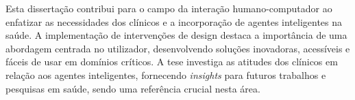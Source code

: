 Esta disserta\c{c}\~{a}o contribui para o campo da intera\c{c}\~{a}o humano-computador ao enfatizar as necessidades dos cl\'{i}nicos e a incorpora\c{c}\~{a}o de agentes inteligentes na sa\'{u}de.
A implementa\c{c}\~{a}o de interven\c{c}\~{o}es de design destaca a import\^{a}ncia de uma abordagem centrada no utilizador, desenvolvendo solu\c{c}\~{o}es inovadoras, acess\'{i}veis e f\'{a}ceis de usar em dom\'{i}nios cr\'{i}ticos.
A tese investiga as atitudes dos cl\'{i}nicos em rela\c{c}\~{a}o aos agentes inteligentes, fornecendo {\it insights} para futuros trabalhos e pesquisas em sa\'{u}de, sendo uma refer\^{e}ncia crucial nesta \'{a}rea.

\clearpage